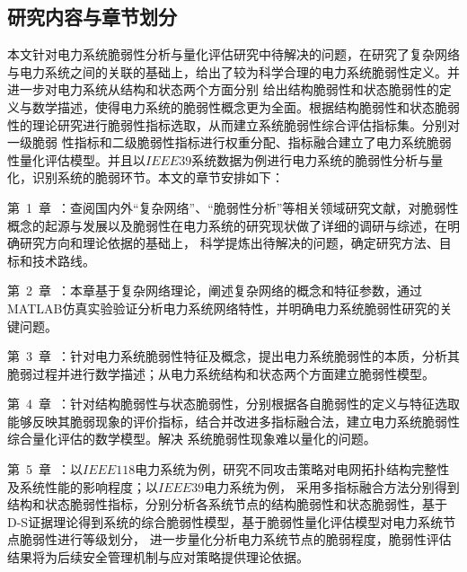 \subsection{研究内容与章节划分}
\label{sec:contendAndIdea}
本文针对电力系统脆弱性分析与量化评估研究中待解决的问题，在研究了复杂网络与电力系统之间的关联的基础上，给出了较为科学合理的电力系统脆弱性定义。并进一步对电力系统从结构和状态两个方面分别
给出结构脆弱性和状态脆弱性的定义与数学描述，使得电力系统的脆弱性概念更为全面。根据结构脆弱性和状态脆弱性的理论研究进行脆弱性指标选取，从而建立系统脆弱性综合评估指标集。分别对一级脆弱
性指标和二级脆弱性指标进行权重分配、指标融合建立了电力系统脆弱性量化评估模型。并且以$IEEE39$系统数据为例进行电力系统的脆弱性分析与量化，识别系统的脆弱环节。本文的章节安排如下：

第~1~章~：查阅国内外“复杂网络”、“脆弱性分析”等相关领域研究文献，对脆弱性概念的起源与发展以及脆弱性在电力系统的研究现状做了详细的调研与综述，在明确研究方向和理论依据的基础上，
科学提炼出待解决的问题，确定研究方法、目标和技术路线。

第~2~章~：本章基于复杂网络理论，阐述复杂网络的概念和特征参数，通过MATLAB仿真实验验证分析电力系统网络特性，并明确电力系统脆弱性研究的关键问题。

第~3~章~：针对电力系统脆弱性特征及概念，提出电力系统脆弱性的本质，分析其脆弱过程并进行数学描述；从电力系统结构和状态两个方面建立脆弱性模型。

第~4~章~：针对结构脆弱性与状态脆弱性，分别根据各自脆弱性的定义与特征选取能够反映其脆弱现象的评价指标，结合并改进多指标融合法，建立电力系统脆弱性综合量化评估的数学模型。解决
系统脆弱性现象难以量化的问题。


第~5~章~：以$IEEE118$电力系统为例，研究不同攻击策略对电网拓扑结构完整性及系统性能的影响程度；以$IEEE39$电力系统为例，
采用多指标融合方法分别得到结构和状态脆弱性指标，分别分析各系统节点的结构脆弱性和状态脆弱性，基于D-S证据理论得到系统的综合脆弱性模型，基于脆弱性量化评估模型对电力系统节点脆弱性进行等级划分，
进一步量化分析电力系统节点的脆弱程度，脆弱性评估结果将为后续安全管理机制与应对策略提供理论依据。

